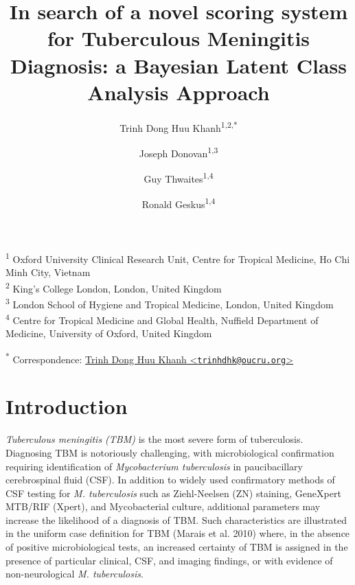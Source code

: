 \documentclass[
]{article}
\title{In search of a novel scoring system for Tuberculous Meningitis Diagnosis: a Bayesian Latent Class Analysis Approach}
\author{Trinh Dong Huu Khanh\textsuperscript{1,2,*} \and Joseph Donovan\textsuperscript{1,3} \and Guy Thwaites\textsuperscript{1,4} \and Ronald Geskus\textsuperscript{1,4}}
\date{}
\begin{document}
\maketitle

\textsuperscript{1} Oxford University Clinical Research Unit, Centre for Tropical Medicine, Ho Chi Minh City, Vietnam\\
\textsuperscript{2} King's College London, London, United Kingdom\\
\textsuperscript{3} London School of Hygiene and Tropical Medicine, London, United Kingdom\\
\textsuperscript{4} Centre for Tropical Medicine and Global Health, Nuffield Department of Medicine, University of Oxford, United Kingdom

\textsuperscript{*} Correspondence: \href{mailto:trinhdhk@oucru.org}{Trinh Dong Huu Khanh \textless{}\href{mailto:trinhdhk@oucru.org}{\nolinkurl{trinhdhk@oucru.org}}\textgreater{}}

\hypertarget{introduction}{%
\section{Introduction}\label{introduction}}

\emph{Tuberculous meningitis (TBM)} is the most severe form of tuberculosis. Diagnosing TBM is notoriously challenging, with microbiological confirmation requiring identification of \emph{Mycobacterium tuberculosis} in paucibacillary cerebrospinal fluid (CSF). In addition to widely used confirmatory methods of CSF testing for \emph{M. tuberculosis} such as Ziehl-Neelsen (ZN) staining, GeneXpert MTB/RIF (Xpert), and Mycobacterial culture, additional parameters may increase the likelihood of a diagnosis of TBM. Such characteristics are illustrated in the uniform case definition for TBM (Marais et al. 2010) where, in the absence of positive microbiological tests, an increased certainty of TBM is assigned in the presence of particular clinical, CSF, and imaging findings, or with evidence of non-neurological \emph{M. tuberculosis}.
\end{document}

